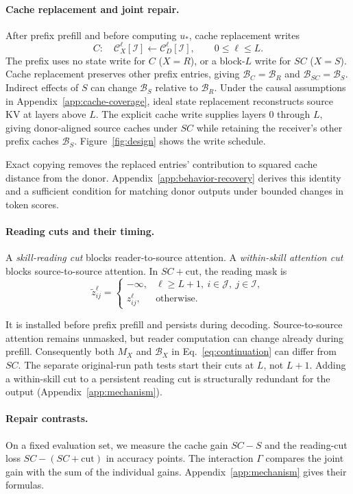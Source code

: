 \paragraph{Cache replacement and joint repair.}
After prefix prefill and before computing $u_*$, cache replacement writes
\begin{equation}
C:\quad \mathcal C_X^\ell[\mathcal I]
 \leftarrow\mathcal C_D^\ell[\mathcal I],\qquad 0\le\ell\le L.
\label{eq:cache}
\end{equation}
The prefix uses no state write for $C$ ($X=R$), or a block-$L$ write for
$SC$ ($X=S$). Cache replacement preserves other prefix entries, giving
$\mathcal B_C=\mathcal B_R$ and $\mathcal B_{SC}=\mathcal B_S$.
Indirect effects of $S$ can change $\mathcal B_S$ relative to $\mathcal B_R$.
Under the causal assumptions in Appendix~\ref{app:cache-coverage}, ideal
state replacement reconstructs source KV at layers above $L$. The explicit
cache write supplies layers $0$ through $L$, giving donor-aligned source
caches under $SC$ while retaining the receiver's other prefix caches
$\mathcal B_S$. Figure~\ref{fig:design} shows the write schedule.

Exact copying removes the replaced entries' contribution to squared
cache distance from the donor. Appendix~\ref{app:behavior-recovery} derives this identity
and a sufficient condition for matching donor outputs under bounded
changes in token scores.

\begin{samepage}
\paragraph{Reading cuts and their timing.}
A \emph{skill-reading cut} blocks reader-to-source attention.
A \emph{within-skill attention cut} blocks source-to-source attention.
In $SC+\mathrm{cut}$, the reading mask is
\begin{equation}
\widetilde z^\ell_{ij}=
\begin{cases}
-\infty,&\ell\ge L+1,\ i\in\mathcal J,\ j\in\mathcal I,\\
z^\ell_{ij},&\text{otherwise}.
\end{cases}
\label{eq:reading-cut}
\end{equation}
\end{samepage}
It is installed before prefix prefill and persists during decoding.
Source-to-source attention remains unmasked, but reader computation can
change already during prefill. Consequently both $M_X$ and
$\mathcal B_X$ in Eq.~\eqref{eq:continuation} can differ from $SC$.
The separate original-run path tests start their cuts at $L$, not $L+1$.
Adding a within-skill cut to a persistent reading cut is structurally
redundant for the output (Appendix~\ref{app:mechanism}).

\paragraph{Repair contrasts.}
On a fixed evaluation set, we measure the cache gain $SC-S$ and the
reading-cut loss $SC-(SC+\mathrm{cut})$ in accuracy points.
The interaction $\Gamma$ compares the joint gain with the sum of the
individual gains. Appendix~\ref{app:mechanism} gives their formulas.

